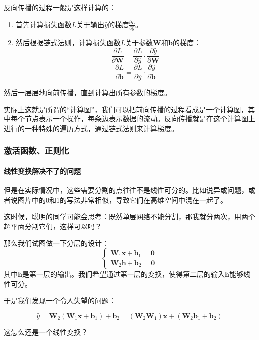 \documentclass[fontset=none]{ctexart}
\begin{document}
反向传播的过程一般是这样计算的：

\begin{enumerate}
    \item 首先计算损失函数$L$关于输出$\hat{y}$的梯度$\frac{\partial L}{\partial \hat{y}}$。
    \item 然后根据链式法则，计算损失函数$L$关于参数$\mathbf{W}$和$\mathbf{b}$的梯度：
        \[\frac{\partial L}{\partial \mathbf{W}} = \frac{\partial L}{\partial \hat{y}} \cdot \frac{\partial \hat{y}}{\partial \mathbf{W}}\]
        \[\frac{\partial L}{\partial \mathbf{b}} = \frac{\partial L}{\partial \hat{y}} \cdot \frac{\partial \hat{y}}{\partial \mathbf{b}}\]
\end{enumerate}
然后一层层地向前传播，直到计算出所有参数的梯度。

实际上这就是所谓的“计算图”，我们可以把前向传播的过程看成是一个计算图，其中每个节点表示一个操作，每条边表示数据的流动。反向传播就是在这个计算图上进行的一种特殊的遍历方式，通过链式法则来计算梯度。

\subsubsection{激活函数、正则化}

\paragraph{线性变换解决不了的问题}

但是在实际情况中，这些需要分割的点往往不是线性可分的。比如说异或问题，或者说图片中的0和1的写法非常相似，导致它们在高维空间中混在一起了。

这时候，聪明的同学可能会思考：既然单层网络不能分割，那我就分两次，用两个超平面分割它们，这样可以吗？

那么我们试图做一下分层的设计：
\[
    \begin{cases}
        \mathbf{W}_1\mathbf{x} + \mathbf{b}_1 = \mathbf{0} \\
        \mathbf{W}_2\mathbf{h} + \mathbf{b}_2 = \mathbf{0}
\end{cases}\]
其中$\mathbf{h}$是第一层的输出。我们希望通过第一层的变换，使得第二层的输入$\mathbf{h}$能够线性可分。

于是我们发现一个令人失望的问题：

\[\hat{y} = \mathbf{W}_2(\mathbf{W}_1\mathbf{x} + \mathbf{b}_1) + \mathbf{b}_2 = (\mathbf{W}_2\mathbf{W}_1)\mathbf{x} + (\mathbf{W}_2\mathbf{b}_1 + \mathbf{b}_2)\]

这怎么还是一个线性变换？
\end{document}
